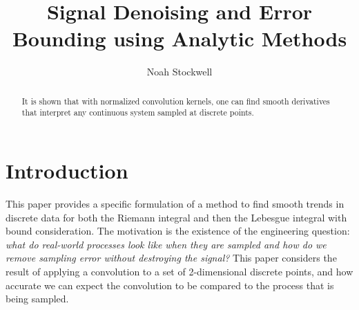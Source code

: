 \documentclass[11pt]{amsart}
\theoremstyle{definition}
\theoremstyle{remark}
\begin{document}
\title{Signal Denoising and Error Bounding using Analytic Methods}
\author{Noah Stockwell}

\begin{abstract}
It is shown that with normalized convolution kernels, one can find smooth derivatives that interpret any continuous system sampled at discrete points.
\end{abstract}


\maketitle
\tableofcontents

\section{Introduction}
This paper provides a specific formulation of a method to find smooth trends in discrete data for both the Riemann integral and then the Lebesgue integral with bound consideration. The motivation is the existence of the engineering question: \textit{what do real-world processes look like when they are sampled and how do we remove sampling error without destroying the signal?} This paper considers the result of applying a convolution to a set of 2-dimensional discrete points, and how accurate we can expect the convolution to be compared to the process that is being sampled.
\newpage
\end{document}
